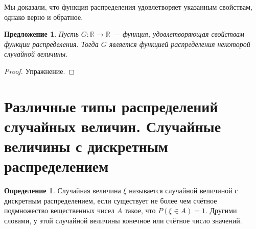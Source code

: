 \documentclass[11pt,openany,a4paper]{scrartcl}
\theoremstyle{plain}
\newtheorem{proposition}[theorem]{Предложение}
\theoremstyle{definition}
\newtheorem{definition}[theorem]{Определение}
\newcommand\mb{\mathbb}
\newcommand\real{\mb R}
\begin{document}
Мы доказали, что функция распределения удовлетворяет указанным свойствам, однако
верно и обратное.

\begin{proposition}
    Пусть $G: \real \to \real$ — функция, удовлетворяющая свойствам функции
    распределения. Тогда $G$ является функцией распределения некоторой случайной 
    величины.
\end{proposition}
\begin{proof}
    Упражнение.
\end{proof}

\section{Различные типы распределений случайных величин. Случайные величины
с дискретным распределением}

\begin{definition}
    Случайная величина $\xi$ называется случайной величиной с дискретным 
    распределением, если существует не более чем счётное подмножество
    вещественных чисел $A$ такое, что $P(\xi \in A) = 1$. Другими словами, у этой
    случайной величины конечное или счётное число значений.
\end{definition}
\end{document}
